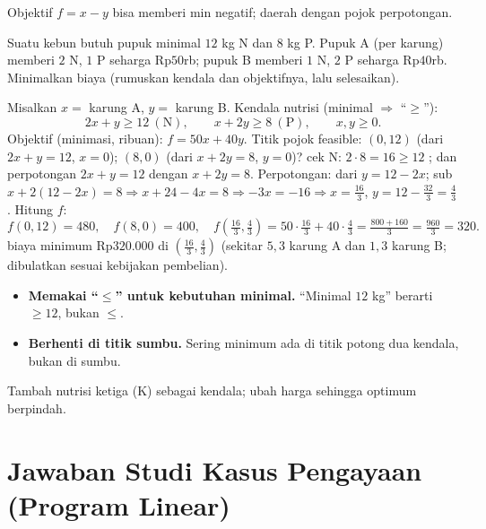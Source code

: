 \begin{variasi}
Objektif $f=x-y$ bisa memberi min negatif; daerah dengan pojok perpotongan.
\end{variasi}

\begin{soalbox}{}
Suatu kebun butuh pupuk minimal $12$ kg N dan $8$ kg P. Pupuk A (per karung)
memberi $2$ N, $1$ P seharga Rp$50$rb; pupuk B memberi $1$ N, $2$ P seharga
Rp$40$rb. Minimalkan biaya (rumuskan kendala dan objektifnya, lalu selesaikan).
\end{soalbox}

\jawab
{} Misalkan $x=$ karung A, $y=$ karung B. Kendala nutrisi (minimal
$\Rightarrow$ ``$\ge$''):
\[
2x+y\ge12\ (\text{N}),\qquad x+2y\ge8\ (\text{P}),\qquad x,y\ge0.
\]
Objektif (minimasi, ribuan): $f=50x+40y$.
 Titik pojok feasible: $(0,12)$ (dari $2x+y=12$, $x=0$); $(8,0)$
(dari $x+2y=8$, $y=0$)? cek N: $2\cdot8=16\ge12$ \checkmark; dan perpotongan
$2x+y=12$ dengan $x+2y=8$.
 Perpotongan: dari $y=12-2x$; sub $x+2(12-2x)=8\Rightarrow
x+24-4x=8\Rightarrow -3x=-16\Rightarrow x=\tfrac{16}{3}$, $y=12-\tfrac{32}{3}
=\tfrac{4}{3}$.
 Hitung $f$:
\[
f(0,12)=480,\quad f(8,0)=400,\quad f\!\left(\tfrac{16}{3},\tfrac43\right)
=50\cdot\tfrac{16}{3}+40\cdot\tfrac43=\tfrac{800+160}{3}=\tfrac{960}{3}=320.
\]
\jadi biaya minimum Rp$320.000$ di $\left(\tfrac{16}{3},\tfrac43\right)$
(sekitar $5{,}3$ karung A dan $1{,}3$ karung B; dibulatkan sesuai kebijakan
pembelian).

\begin{jebakan}
\begin{itemize}[leftmargin=*,topsep=2pt]
  \item \textbf{Memakai ``$\le$'' untuk kebutuhan minimal.} ``Minimal $12$ kg''
  berarti $\ge12$, bukan $\le$.
  \item \textbf{Berhenti di titik sumbu.} Sering minimum ada di titik potong dua
  kendala, bukan di sumbu.
\end{itemize}
\end{jebakan}

\begin{variasi}
Tambah nutrisi ketiga (K) sebagai kendala; ubah harga sehingga optimum berpindah.
\end{variasi}

\section*{Jawaban Studi Kasus Pengayaan (Program Linear)}


